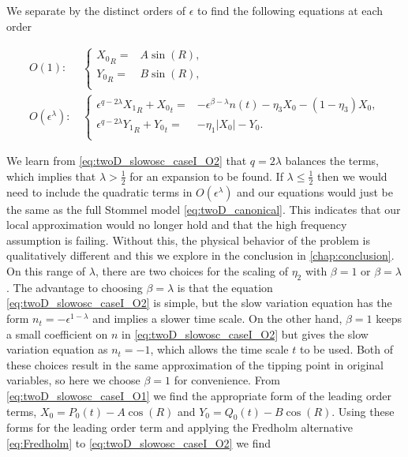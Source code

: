 We separate by the distinct orders of $\epsilon$ to find the following equations at each order

\begin{align} \label{eq:twoD_slowosc_caseI_O1}
O(1):\, &\begin{cases}
	{X_0}_R =& A\sin(R), \\
	{Y_0}_R =& B\sin(R),\\
\end{cases}\\ \label{eq:twoD_slowosc_caseI_O2}
O(\epsilon^\lambda): \, & \begin{cases}
	\epsilon^{q-2\lambda}{X_1}_R+{X_0}_t =& -\epsilon^{\beta-\lambda} n(t) -\eta_3 X_0-(1-\eta_3)X_0, \\
	\epsilon^{q-2\lambda}{Y_1}_R+{Y_0}_t =& -\eta_1|X_0|-Y_0.\\
\end{cases}
\end{align}

We learn from \eqref{eq:twoD_slowosc_caseI_O2} that $q= 2\lambda$ balances the terms, which implies that $\lambda> \frac{1}{2}$ for an expansion to be found. If $\lambda\le \frac{1}{2}$ then we would need to include the quadratic terms in $O(\epsilon^\lambda)$ and our equations would just be the same as the full Stommel model \eqref{eq:twoD_canonical}. This indicates that our local approximation would no longer hold and that the high frequency assumption is failing. Without this, the physical behavior of the problem is qualitatively different and this we explore in the conclusion in \autoref{chap:conclusion}. On this range of $\lambda$, there are two choices for the scaling of $\eta_2$ with $\beta=1$ or $\beta=\lambda$. The advantage to choosing $\beta=\lambda$ is that the equation \eqref{eq:twoD_slowosc_caseI_O2} is simple, but the slow variation equation has the form $n_t = -\epsilon^{1-\lambda}$ and implies a slower time scale. On the other hand, $\beta=1$ keeps a small coefficient on $n$ in \eqref{eq:twoD_slowosc_caseI_O2} but gives the slow variation equation as $n_t=-1$, which allows the time scale $t$ to be used. Both of these choices result in the same approximation of the tipping point in original variables, so here we choose $\beta=1$ for convenience. From \eqref{eq:twoD_slowosc_caseI_O1} we find the appropriate form of the leading order terms, $X_0=P_0(t)-A\cos(R)$ and $Y_0=Q_0(t)-B\cos(R)$. Using these forms for the leading order term and applying the Fredholm alternative \eqref{eq:Fredholm} to \eqref{eq:twoD_slowosc_caseI_O2} we find 

